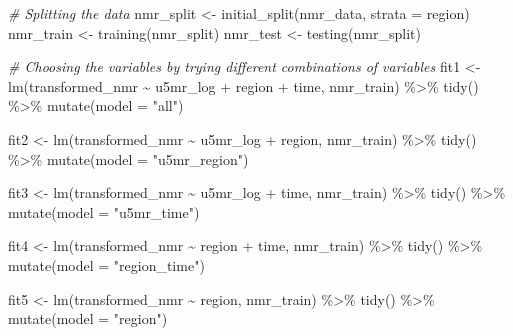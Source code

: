 \documentclass[
]{article}
\newenvironment{Shaded}{\begin{snugshade}}{\end{snugshade}}
\newcommand{\AttributeTok}[1]{\textcolor[rgb]{0.77,0.63,0.00}{#1}}
\newcommand{\CommentTok}[1]{\textcolor[rgb]{0.56,0.35,0.01}{\textit{#1}}}
\newcommand{\FunctionTok}[1]{\textcolor[rgb]{0.00,0.00,0.00}{#1}}
\newcommand{\NormalTok}[1]{#1}
\newcommand{\OtherTok}[1]{\textcolor[rgb]{0.56,0.35,0.01}{#1}}
\newcommand{\SpecialCharTok}[1]{\textcolor[rgb]{0.00,0.00,0.00}{#1}}
\newcommand{\StringTok}[1]{\textcolor[rgb]{0.31,0.60,0.02}{#1}}
\begin{document}
\begin{Shaded}
\begin{Highlighting}[]
\CommentTok{\# Splitting the data}
\NormalTok{nmr\_split }\OtherTok{\textless{}{-}} \FunctionTok{initial\_split}\NormalTok{(nmr\_data, }\AttributeTok{strata =}\NormalTok{ region)}
\NormalTok{nmr\_train }\OtherTok{\textless{}{-}} \FunctionTok{training}\NormalTok{(nmr\_split)}
\NormalTok{nmr\_test }\OtherTok{\textless{}{-}} \FunctionTok{testing}\NormalTok{(nmr\_split)}

\CommentTok{\# Choosing the variables by trying different combinations of variables}
\NormalTok{fit1 }\OtherTok{\textless{}{-}} \FunctionTok{lm}\NormalTok{(transformed\_nmr }\SpecialCharTok{\textasciitilde{}}\NormalTok{ u5mr\_log }\SpecialCharTok{+}\NormalTok{ region }\SpecialCharTok{+}\NormalTok{ time, nmr\_train) }\SpecialCharTok{\%\textgreater{}\%} 
  \FunctionTok{tidy}\NormalTok{() }\SpecialCharTok{\%\textgreater{}\%} 
  \FunctionTok{mutate}\NormalTok{(}\AttributeTok{model =} \StringTok{"all"}\NormalTok{)}

\NormalTok{fit2 }\OtherTok{\textless{}{-}} \FunctionTok{lm}\NormalTok{(transformed\_nmr }\SpecialCharTok{\textasciitilde{}}\NormalTok{ u5mr\_log }\SpecialCharTok{+}\NormalTok{ region, nmr\_train) }\SpecialCharTok{\%\textgreater{}\%} 
  \FunctionTok{tidy}\NormalTok{() }\SpecialCharTok{\%\textgreater{}\%} 
  \FunctionTok{mutate}\NormalTok{(}\AttributeTok{model =} \StringTok{"u5mr\_region"}\NormalTok{)}

\NormalTok{fit3 }\OtherTok{\textless{}{-}} \FunctionTok{lm}\NormalTok{(transformed\_nmr }\SpecialCharTok{\textasciitilde{}}\NormalTok{ u5mr\_log }\SpecialCharTok{+}\NormalTok{ time, nmr\_train) }\SpecialCharTok{\%\textgreater{}\%} 
  \FunctionTok{tidy}\NormalTok{() }\SpecialCharTok{\%\textgreater{}\%} 
  \FunctionTok{mutate}\NormalTok{(}\AttributeTok{model =} \StringTok{"u5mr\_time"}\NormalTok{)}

\NormalTok{fit4 }\OtherTok{\textless{}{-}} \FunctionTok{lm}\NormalTok{(transformed\_nmr }\SpecialCharTok{\textasciitilde{}}\NormalTok{ region }\SpecialCharTok{+}\NormalTok{ time, nmr\_train) }\SpecialCharTok{\%\textgreater{}\%} 
  \FunctionTok{tidy}\NormalTok{() }\SpecialCharTok{\%\textgreater{}\%} 
  \FunctionTok{mutate}\NormalTok{(}\AttributeTok{model =} \StringTok{"region\_time"}\NormalTok{)}

\NormalTok{fit5 }\OtherTok{\textless{}{-}} \FunctionTok{lm}\NormalTok{(transformed\_nmr }\SpecialCharTok{\textasciitilde{}}\NormalTok{ region, nmr\_train) }\SpecialCharTok{\%\textgreater{}\%} 
  \FunctionTok{tidy}\NormalTok{() }\SpecialCharTok{\%\textgreater{}\%} 
  \FunctionTok{mutate}\NormalTok{(}\AttributeTok{model =} \StringTok{"region"}\NormalTok{)}


\end{Highlighting}
\end{Shaded}
\end{document}
